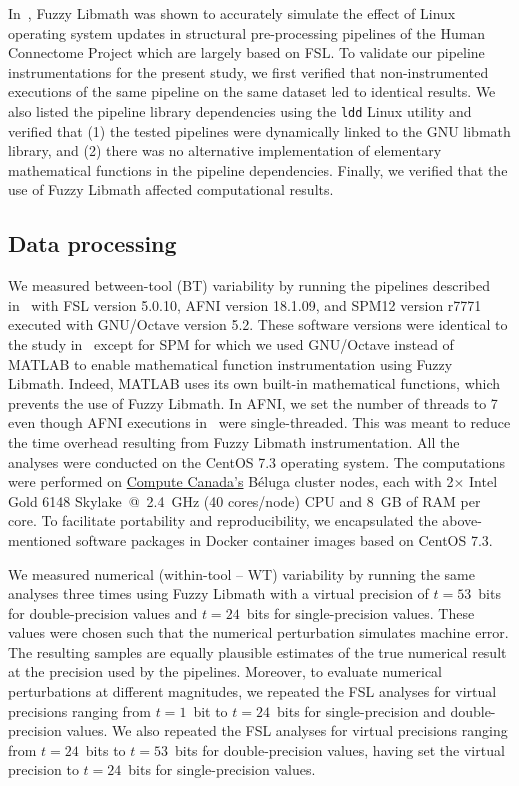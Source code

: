 \documentclass[11pt,onecolumn]{article}
\begin{document}
In~\cite{salari2021accurate}, Fuzzy Libmath was shown to accurately
simulate the effect of Linux operating system updates in structural
pre-processing pipelines of the Human Connectome Project which are largely based on FSL.
 To validate our pipeline instrumentations for the present study, we first verified that non-instrumented
executions of the same pipeline on the same dataset led to identical
results. We also listed the pipeline
library dependencies using the \texttt{ldd} Linux utility and verified that
(1) the tested pipelines were dynamically linked to the GNU libmath library, and 
(2) there was no alternative implementation of elementary mathematical functions in the pipeline dependencies.
Finally, we verified that the use of Fuzzy Libmath affected computational results.

\subsection{Data processing}

We measured between-tool (BT) variability by running the pipelines
described in~\cite{bowring2019exploring} with FSL version 5.0.10, AFNI
version 18.1.09, and SPM12 version r7771 executed with GNU/Octave version
5.2. These software versions were identical to the study
in~\cite{bowring2019exploring} except for SPM for which we used GNU/Octave
instead of MATLAB to enable mathematical function instrumentation using
Fuzzy Libmath. Indeed, MATLAB uses its own built-in mathematical functions,
which prevents the use of Fuzzy Libmath. In AFNI, we set the number of
threads to 7 even though AFNI executions
in~\cite{bowring2019exploring} were single-threaded. This was meant to
reduce the time overhead resulting from Fuzzy Libmath instrumentation. All
the analyses were conducted on the CentOS 7.3 operating system. The
computations were performed on \href{https://www.computecanada.ca}{Compute
Canada's} Béluga cluster nodes, each with 2$\times$ Intel Gold 6148 Skylake~@~2.4~GHz
 (40 cores/node) CPU and 8~GB of RAM per core. To facilitate portability and reproducibility,
 we encapsulated the
above-mentioned software packages in Docker container images based on CentOS 7.3.

We measured numerical (within-tool -- WT) variability by running the same analyses three
times using Fuzzy Libmath with a virtual precision of $t=53$~bits for
double-precision values and $t=24$~bits for single-precision values. These
values were chosen such that the numerical perturbation simulates machine
error. The resulting samples are equally plausible estimates of
the true numerical result at the precision used by the pipelines. Moreover, to evaluate numerical perturbations at different magnitudes, 
we repeated the FSL analyses for virtual
precisions ranging from $t=1$~bit to $t=24$~bits for single-precision
and double-precision values. We also repeated the FSL analyses for virtual 
precisions ranging from $t=24$~bits to $t=53$~bits for double-precision values, having 
set the virtual precision to $t=24$~bits for single-precision values. 
\end{document}
